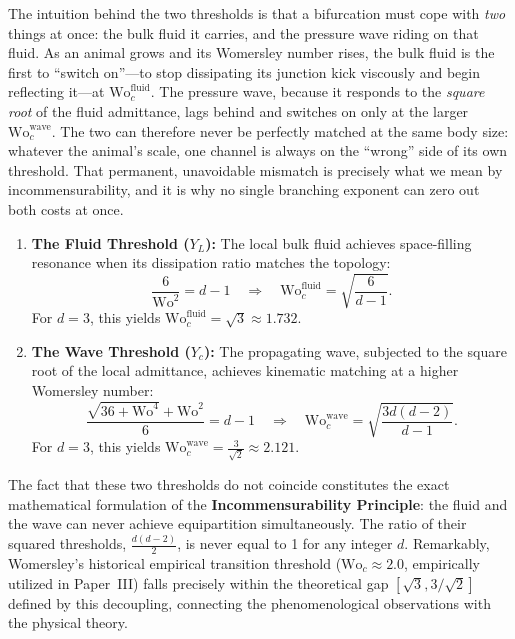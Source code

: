 The intuition behind the two thresholds is that a bifurcation must cope
with \emph{two} things at once: the bulk fluid it carries, and the pressure wave
riding on that fluid. As an animal grows and its Womersley number rises, the
bulk fluid is the first to ``switch on''---to stop dissipating its junction kick
viscously and begin reflecting it---at $\mathrm{Wo}_c^{\mathrm{fluid}}$. The
pressure wave, because it responds to the \emph{square root} of the fluid
admittance, lags behind and switches on only at the larger
$\mathrm{Wo}_c^{\mathrm{wave}}$. The two can therefore never be perfectly
matched at the same body size: whatever the animal's scale, one channel is
always on the ``wrong'' side of its own threshold. That permanent, unavoidable
mismatch is precisely what we mean by incommensurability, and it is why no
single branching exponent can zero out both costs at once.

\begin{enumerate}
    \item
\textbf{The Fluid Threshold ($Y_L$):} The local bulk fluid achieves
space-filling resonance when its dissipation ratio matches the topology:
    \begin{equation}
        \frac{6}{\mathrm{Wo}^2} = d - 1 \quad \Rightarrow \quad \mathrm{Wo}_c^{\mathrm{fluid}} = \sqrt{\frac{6}{d-1}}.
    \end{equation}
For $d=3$, this yields $\mathrm{Wo}_c^{\mathrm{fluid}} = \sqrt{3} \approx
1.732$.
    \item
\textbf{The Wave Threshold ($Y_c$):} The propagating wave, subjected to the
square root of the local admittance, achieves kinematic matching at a higher
Womersley number:
    \begin{equation}
        \frac{\sqrt{36+\mathrm{Wo}^4}+\mathrm{Wo}^2}{6} = d - 1 \quad \Rightarrow \quad \mathrm{Wo}_c^{\mathrm{wave}} = \sqrt{\frac{3d(d-2)}{d-1}}.
    \end{equation}
For $d=3$, this yields $\mathrm{Wo}_c^{\mathrm{wave}} = \frac{3}{\sqrt{2}}
\approx 2.121$.
\end{enumerate}

The fact that these two thresholds do not coincide constitutes the exact
mathematical formulation of the \textbf{Incommensurability Principle}: the fluid
and the wave can never achieve equipartition simultaneously. The ratio of their
squared thresholds, $\frac{d(d-2)}{2}$, is never equal to 1 for any integer $d$.
Remarkably, Womersley's historical empirical transition threshold
($\mathrm{Wo}_c \approx 2.0$, empirically utilized in Paper~III) falls precisely
within the theoretical gap $[\sqrt{3}, 3/\sqrt{2}]$ defined by this decoupling,
connecting the phenomenological observations with the physical theory.


